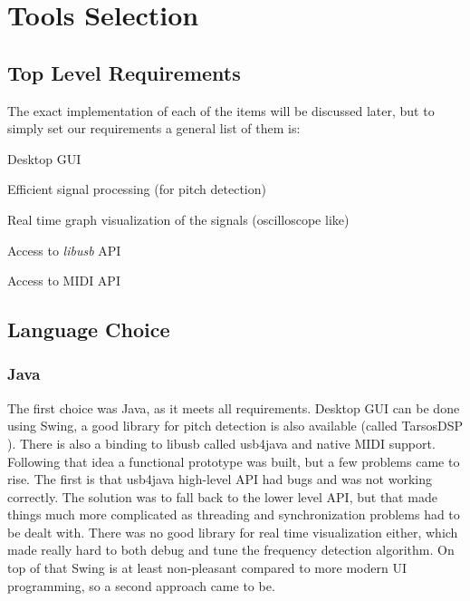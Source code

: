 \section{Tools Selection}
\label{tools-selection}

\subsection{Top Level Requirements}
The exact implementation of each of the items will be discussed later, but to
simply set our requirements a general list of them is:

\begin{itemlist}
  \item Desktop GUI
  \item Efficient signal processing (for pitch detection)
  \item Real time graph visualization of the signals (oscilloscope like)
  \item Access to \textit{libusb} \cite{libusb} API
  \item Access to MIDI API
\end{itemlist}

\subsection{Language Choice}

\subsubsection{Java}
The first choice was Java, as it meets all requirements. Desktop GUI can be done
using Swing, a good library for pitch detection is also available (called TarsosDSP \cite{TarsosDSP}).
There is also a binding to libusb called usb4java and native MIDI support. \\
Following that idea a functional prototype was built, but a few problems came to rise.
The first is that usb4java high-level API had bugs and was not working correctly.
The solution was to fall back to the lower level API, but that made things much
more complicated as threading and synchronization problems had to be dealt with.
There was no good library for
real time visualization either, which made really hard to both debug and tune the
frequency detection algorithm. On top of that Swing is at least non-pleasant
compared to more modern UI programming, so a second approach came to be.

